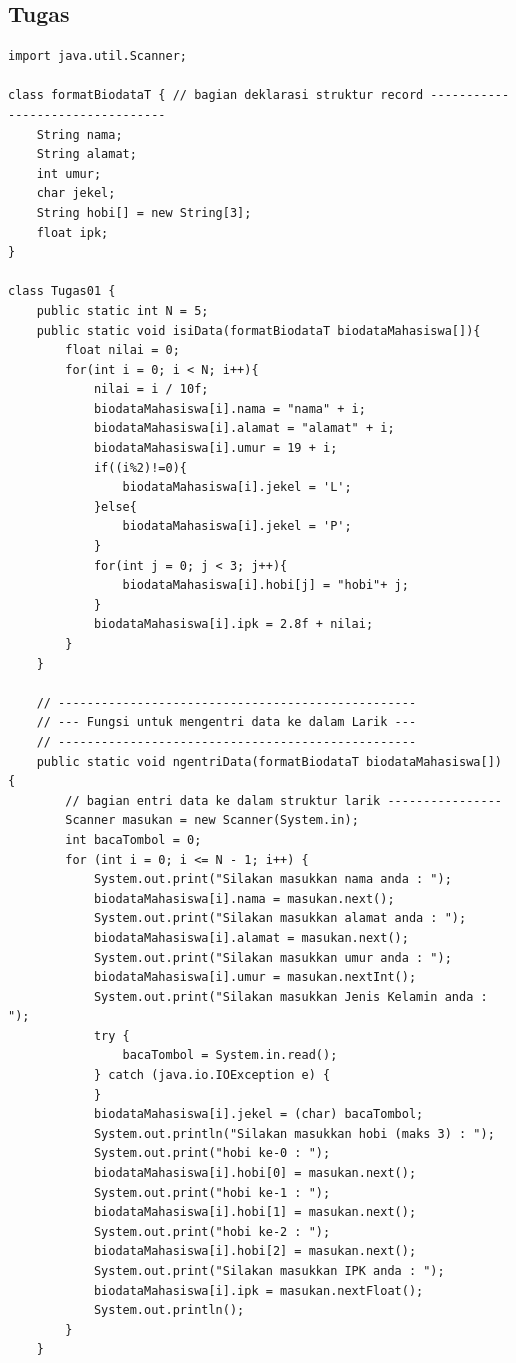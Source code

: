 \documentclass[a4paper,12pt]{article}
\begin{document}
\subsection{Tugas}
\begin{lstlisting}
import java.util.Scanner;

class formatBiodataT { // bagian deklarasi struktur record ---------------------------------
    String nama;
    String alamat;
    int umur;
    char jekel;
    String hobi[] = new String[3];
    float ipk;
}

class Tugas01 {
    public static int N = 5;
    public static void isiData(formatBiodataT biodataMahasiswa[]){
        float nilai = 0;
        for(int i = 0; i < N; i++){
            nilai = i / 10f;
            biodataMahasiswa[i].nama = "nama" + i;
            biodataMahasiswa[i].alamat = "alamat" + i;
            biodataMahasiswa[i].umur = 19 + i;
            if((i%2)!=0){
                biodataMahasiswa[i].jekel = 'L';
            }else{
                biodataMahasiswa[i].jekel = 'P';
            }
            for(int j = 0; j < 3; j++){
                biodataMahasiswa[i].hobi[j] = "hobi"+ j;
            }
            biodataMahasiswa[i].ipk = 2.8f + nilai;
        }
    }

    // --------------------------------------------------
    // --- Fungsi untuk mengentri data ke dalam Larik ---
    // --------------------------------------------------
    public static void ngentriData(formatBiodataT biodataMahasiswa[]) {
        // bagian entri data ke dalam struktur larik ----------------
        Scanner masukan = new Scanner(System.in);
        int bacaTombol = 0;
        for (int i = 0; i <= N - 1; i++) {
            System.out.print("Silakan masukkan nama anda : ");
            biodataMahasiswa[i].nama = masukan.next();
            System.out.print("Silakan masukkan alamat anda : ");
            biodataMahasiswa[i].alamat = masukan.next();
            System.out.print("Silakan masukkan umur anda : ");
            biodataMahasiswa[i].umur = masukan.nextInt();
            System.out.print("Silakan masukkan Jenis Kelamin anda : ");
            try {
                bacaTombol = System.in.read();
            } catch (java.io.IOException e) {
            }
            biodataMahasiswa[i].jekel = (char) bacaTombol;
            System.out.println("Silakan masukkan hobi (maks 3) : ");
            System.out.print("hobi ke-0 : ");
            biodataMahasiswa[i].hobi[0] = masukan.next();
            System.out.print("hobi ke-1 : ");
            biodataMahasiswa[i].hobi[1] = masukan.next();
            System.out.print("hobi ke-2 : ");
            biodataMahasiswa[i].hobi[2] = masukan.next();
            System.out.print("Silakan masukkan IPK anda : ");
            biodataMahasiswa[i].ipk = masukan.nextFloat();
            System.out.println();
        }
    }


\end{lstlisting}
\end{document}
